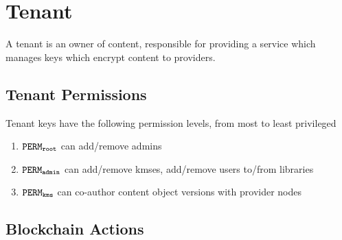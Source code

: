 \documentclass{article}
\begin{document}
\section{Tenant}

A tenant is an owner of content, responsible for providing a service which manages keys which encrypt content to providers.


\subsection{Tenant Permissions}
Tenant keys have the following permission levels, from most to least privileged

\begin{enumerate}
  \item $\mathtt{PERM_{root}}$ can add/remove admins
  \item $\mathtt{PERM_{admin}}$ can add/remove kmses, add/remove users to/from libraries
  \item $\mathtt{PERM_{kms}}$ can co-author content object versions with provider nodes
\end{enumerate}

\subsection{Blockchain Actions}
\end{document}
